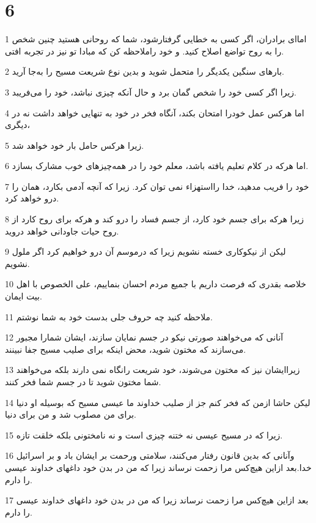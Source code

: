 \chapter{6}

\par 1 اما‌ای برادران، اگر کسی به خطایی گرفتارشود، شما که روحانی هستید چنین شخص را به روح تواضع اصلاح کنید. و خود راملاحظه کن که مبادا تو نیز در تجربه افتی.
\par 2 بارهای سنگین یکدیگر را متحمل شوید و بدین نوع شریعت مسیح را به‌جا آرید.
\par 3 زیرا اگر کسی خود را شخص گمان برد و حال آنکه چیزی نباشد، خود را می‌فریبد.
\par 4 اما هرکس عمل خودرا امتحان بکند، آنگاه فخر در خود به تنهایی خواهد داشت نه در دیگری،
\par 5 زیرا هرکس حامل بار خود خواهد شد.
\par 6 اما هرکه در کلام تعلیم یافته باشد، معلم خود را در همه‌چیزهای خوب مشارک بسازد.
\par 7 خود را فریب مدهید، خدا رااستهزاء نمی توان کرد. زیرا که آنچه آدمی بکارد، همان را درو خواهد کرد.
\par 8 زیرا هر‌که برای جسم خود کارد، از جسم فساد را درو کند و هرکه برای روح کارد از روح حیات جاودانی خواهد دروید.
\par 9 لیکن از نیکوکاری خسته نشویم زیرا که درموسم آن درو خواهیم کرد اگر ملول نشویم.
\par 10 خلاصه بقدری که فرصت داریم با جمیع مردم احسان بنماییم، علی الخصوص با اهل بیت ایمان.
\par 11 ملاحظه کنید چه حروف جلی بدست خود به شما نوشتم.
\par 12 آنانی که می‌خواهند صورتی نیکو در جسم نمایان سازند، ایشان شمارا مجبور می‌سازند که مختون شوید، محض اینکه برای صلیب مسیح جفا نبینند.
\par 13 زیراایشان نیز که مختون می‌شوند، خود شریعت رانگاه نمی دارند بلکه می‌خواهند شما مختون شوید تا در جسم شما فخر کنند.
\par 14 لیکن حاشا ازمن که فخر کنم جز از صلیب خداوند ما عیسی مسیح که بوسیله او دنیا برای من مصلوب شد و من برای دنیا.
\par 15 زیرا که در مسیح عیسی نه ختنه چیزی است و نه نامختونی بلکه خلقت تازه.
\par 16 وآنانی که بدین قانون رفتار می‌کنند، سلامتی ورحمت بر ایشان باد و بر اسرائیل خدا.بعد ازاین هیچ‌کس مرا زحمت نرساند زیرا که من در بدن خود داغهای خداوند عیسی را دارم.
\par 17 بعد ازاین هیچ‌کس مرا زحمت نرساند زیرا که من در بدن خود داغهای خداوند عیسی را دارم.



